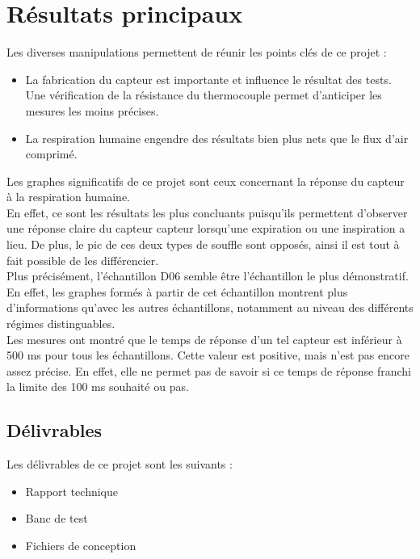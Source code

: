 \section{Résultats principaux}
Les diverses manipulations permettent de réunir les points clés de ce projet :
\begin{itemize}
    \item La fabrication du capteur est importante et influence le résultat des tests. Une vérification de la résistance du thermocouple permet
          d'anticiper les mesures les moins précises. 
    \item La respiration humaine engendre des résultats bien plus nets que le flux d'air comprimé.
\end{itemize}
Les graphes significatifs de ce projet sont ceux concernant la réponse du capteur à la respiration humaine. \\
En effet, ce sont les résultats les plus concluants puisqu'ils permettent d'observer une réponse claire du capteur \gls{capteur} lorsqu'une 
expiration ou une inspiration a lieu. De plus, le pic de ces deux types de souffle sont opposés, ainsi il est tout à fait possible de les 
différencier. \\
Plus précisément, l'échantillon D06 semble être l'échantillon le plus démonstratif. En effet, les graphes formés à partir de cet échantillon 
montrent plus d'informations qu'avec les autres échantillons, notamment au niveau des différents régimes distinguables. \\
Les mesures ont montré que le temps de réponse d'un tel capteur est inférieur à 500 ms pour tous les échantillons. Cette valeur est positive, mais 
n'est pas encore assez précise. En effet, elle ne permet pas de savoir si ce temps de réponse franchi la limite des 100 ms souhaité ou pas. 

\newpage
\subsection{Délivrables}
Les délivrables de ce projet sont les suivants :
\begin{itemize}
    \item Rapport technique
    \item Banc de test
    \item Fichiers de conception
\end{itemize}

